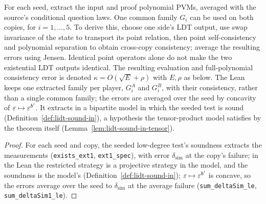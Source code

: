 \begin{lemma}
\label{lem:ar-common-polynomials}
\leanok
For each seed, extract the input and proof polynomial PVMs, averaged with
the source's conditional question laws. One common family $G_i$ can be used
on both copies, for $i=1,\ldots,5$. To derive this, choose one side's LDT
output, use swap invariance of the state to transport its point relation,
then point self-consistency and polynomial separation to obtain cross-copy
consistency; average the resulting errors using Jensen. Identical point
operators alone do not make the two existential LDT outputs identical.
The resulting evaluation and full-polynomial consistency error is denoted
$\kappa=O(\sqrt E+\rho)$ with $E,\rho$ as below.
The Lean keeps one extracted family per player, $G^A_i$ and $G^B_i$, with their consistency,
rather than a single common family; the errors are averaged over the seed by concavity of
$\varepsilon\mapsto\varepsilon^{b'}$. It extracts in a bipartite model in which the seeded test is sound
(Definition~\ref{def:lidt-sound-in}), a hypothesis the tensor-product model satisfies by the
theorem itself (Lemma~\ref{lem:lidt-sound-in-tensor}).
\end{lemma}

\begin{proof}
\leanok
For each seed and copy, the seeded low-degree test's soundness extracts the measurements
(\texttt{exists\_ext1}, \texttt{ext1\_spec}), with error $\delta_{\mathrm{sim}}$ at the copy's
failure; in the Lean the restricted strategy is a projective strategy in the model, and the
soundness is the model's (Definition~\ref{def:lidt-sound-in}); $\varepsilon\mapsto\varepsilon^{b'}$ is concave, so the errors average over the seed to
$\delta_{\mathrm{sim}}$ at the average failure (\texttt{sum\_deltaSim\_le},
\texttt{sum\_deltaSim1\_le}).
\end{proof}

